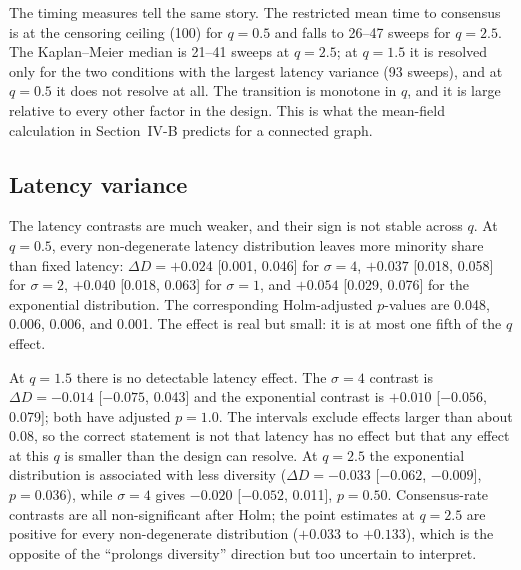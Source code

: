\documentclass[conference]{IEEEtran}
\begin{document}
The timing measures tell the same story. The restricted mean time to consensus is at the censoring ceiling (100) for $q=0.5$ and falls to 26--47 sweeps for $q=2.5$. The Kaplan--Meier median is 21--41 sweeps at $q=2.5$; at $q=1.5$ it is resolved only for the two conditions with the largest latency variance (93 sweeps), and at $q=0.5$ it does not resolve at all. The transition is monotone in $q$, and it is large relative to every other factor in the design. This is what the mean-field calculation in Section~IV-B predicts for a connected graph.

\begin{table}[t]
\centering
\caption{Paired contrasts between $q=2.5$ and $q=0.5$ on random hypergraphs (30 replicates per cell). $\Delta$ is the mean paired difference; intervals are percentile bootstrap 95\% CIs; $p_{\mathrm{Holm}}$ is the Holm-adjusted two-sided sign-flip permutation $p$-value within each latency stratum. The smallest attainable adjusted $p$ is $3\times10^{-4}$.}
\label{tab:effects}

\end{table}

\subsection{Latency variance}
The latency contrasts are much weaker, and their sign is not stable across $q$. At $q=0.5$, every non-degenerate latency distribution leaves more minority share than fixed latency: $\Delta D=+0.024$ [0.001, 0.046] for $\sigma=4$, $+0.037$ [0.018, 0.058] for $\sigma=2$, $+0.040$ [0.018, 0.063] for $\sigma=1$, and $+0.054$ [0.029, 0.076] for the exponential distribution. The corresponding Holm-adjusted $p$-values are 0.048, 0.006, 0.006, and 0.001. The effect is real but small: it is at most one fifth of the $q$ effect.

At $q=1.5$ there is no detectable latency effect. The $\sigma=4$ contrast is $\Delta D=-0.014$ [$-0.075$, 0.043] and the exponential contrast is $+0.010$ [$-0.056$, 0.079]; both have adjusted $p=1.0$. The intervals exclude effects larger than about 0.08, so the correct statement is not that latency has no effect but that any effect at this $q$ is smaller than the design can resolve. At $q=2.5$ the exponential distribution is associated with less diversity ($\Delta D=-0.033$ [$-0.062$, $-0.009$], $p=0.036$), while $\sigma=4$ gives $-0.020$ [$-0.052$, 0.011], $p=0.50$. Consensus-rate contrasts are all non-significant after Holm; the point estimates at $q=2.5$ are positive for every non-degenerate distribution ($+0.033$ to $+0.133$), which is the opposite of the ``prolongs diversity'' direction but too uncertain to interpret.
\end{document}
